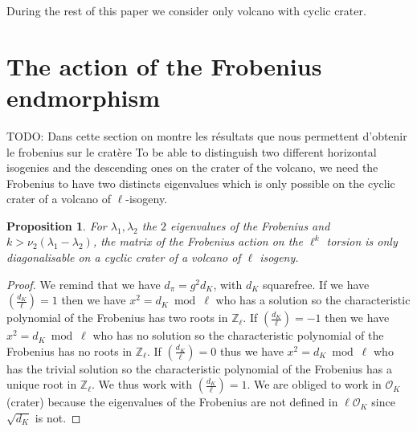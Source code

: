 \documentclass{article}
\newcommand{\todo}[1]{{\color{red}TODO: #1}}
\theoremstyle{plain}
\newtheorem{prop}[thm]{Proposition}
\theoremstyle{definition}
\theoremstyle{remark}
\begin{document}
During the rest of this paper we consider only volcano with cyclic crater.


\section{The action of the Frobenius endmorphism}
\label{sec:acti-frob-endm}
\todo{Dans cette section on montre les résultats que nous permettent d'obtenir le frobenius sur le cratère}
To be able to distinguish two different horizontal isogenies and the descending ones on the crater of the volcano, we need the Frobenius to have two distincts eigenvalues which is only possible on the cyclic crater of a volcano of $\ell$-isogeny.

\begin{prop}
For $\lambda_1 , \lambda_2$ the $2$ eigenvalues of the Frobenius and $k>\nu_2(\lambda_1-\lambda_2)$, the matrix of the Frobenius action on the $\ell^k$ torsion is only diagonalisable on a cyclic crater of a volcano of $\ell$ isogeny.
\end{prop}

\begin{proof}
We remind that we have $d_{\pi}=g^2d_K$, with $d_K$ squarefree.
\newline
If we have $\left( \frac{d_K}{\ell} \right)=1$ then we have $x^2 = d_K \bmod \ell$ who has a solution so the characteristic polynomial of the Frobenius has two roots in $\mathbb{Z}_{\ell}$. If $\left( \frac{d_K}{\ell} \right)=-1$ then we have $x^2 = d_K \bmod \ell$ who has no solution so the characteristic polynomial of the Frobenius has no roots in $\mathbb{Z}_{\ell}$. If $\left( \frac{d_K}{\ell} \right)=0$ thus we have $x^2 = d_K \bmod \ell$ who has the trivial solution so the characteristic polynomial of the Frobenius has a unique root in $\mathbb{Z}_{\ell}$.
\newline
We thus work with $\left( \frac{d_K}{\ell} \right)=1$. We are obliged to work in $\mathcal{O}_K$ (crater)  because the eigenvalues of the Frobenius are not defined in $\ell \mathcal{O}_K$ since $\sqrt{d_K}$ is not.
\end{proof}
\end{document}
